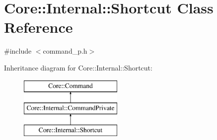\hypertarget{class_core_1_1_internal_1_1_shortcut}{\section{\-Core\-:\-:\-Internal\-:\-:\-Shortcut \-Class \-Reference}
\label{class_core_1_1_internal_1_1_shortcut}
}


{\ttfamily \#include $<$command\-\_\-p.\-h$>$}

\-Inheritance diagram for \-Core\-:\-:\-Internal\-:\-:\-Shortcut\-:\begin{figure}[H]
\begin{center}
\leavevmode
\includegraphics[height=3.000000cm]{class_core_1_1_internal_1_1_shortcut}
\end{center}
\end{figure}
